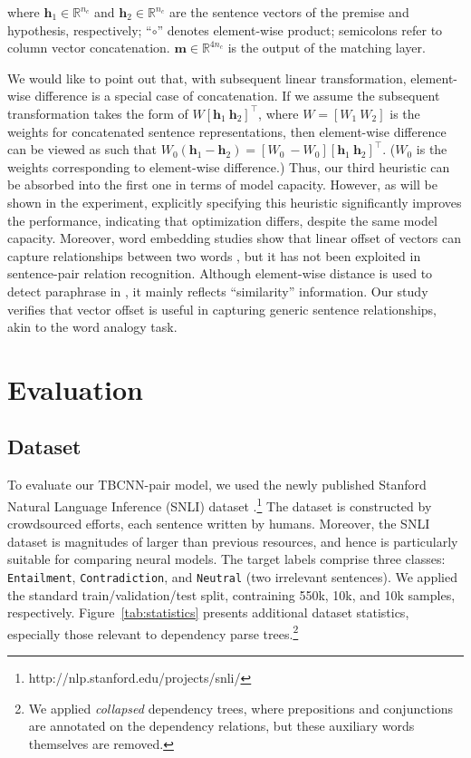 \documentclass[11pt]{article}
\begin{document}
\noindent where $\bm h_1\in\mathbb{R}^{n_c}$ and $\bm h_2\in\mathbb{R}^{n_c}$ are the sentence vectors of the premise and hypothesis, respectively; ``$\circ$'' denotes element-wise product; semicolons refer to column vector concatenation. $\bm m\in\mathbb{R}^{4n_c}$ is the output of the matching layer.

We would like to point out that, with subsequent linear transformation, element-wise difference is a special case of concatenation. 
If we assume the subsequent transformation takes the form of $W[\bm h_1\ \bm h_2]^\top$,
where $W\!\!=\!\![W_1\ W_2]$ is the weights for concatenated sentence representations, then element-wise difference can be viewed as such that $W_0(\bm h_1-\bm h_2)=[W_0\ -\!W_0][\bm h_1\ \bm h_2]^\top$. ($W_0$ is the weights corresponding to element-wise difference.)
Thus, our third heuristic can be absorbed into the first one in terms of model capacity. However, as will be shown in the experiment, explicitly specifying this heuristic significantly improves the performance, indicating that optimization differs, despite the same model capacity.
Moreover, word embedding studies show that linear offset of vectors can capture
relationships between two words \cite{offset}, but it has not been exploited in sentence-pair relation recognition. Although element-wise distance is used to detect paraphrase in , it mainly reflects ``similarity'' information. Our study verifies that vector offset is useful in capturing generic sentence relationships, akin to the word analogy task.

\vspace{-.1cm plus 0cm minus 0cm}
\section{Evaluation}\label{sec:Result}
\vspace{-.2cm plus 0cm minus 0cm}
\subsection{Dataset}\label{ss:dataset}
\vspace{-.1cm plus 0cm minus 0cm}

To evaluate our TBCNN-pair model, we used the newly published Stanford Natural Language Inference (SNLI) dataset \cite{NLI}.\footnote{http://nlp.stanford.edu/projects/snli/
} The dataset is constructed by crowdsourced efforts, each sentence written by humans. 
Moreover, the SNLI dataset is magnitudes of larger than previous resources, and hence is particularly suitable for comparing neural models.
The target labels comprise three classes: {\tt Entailment}, {\tt Contradiction}, and {\tt Neutral} (two irrelevant sentences). We applied the standard train/validation/test split, contraining 550k, 10k, and 10k samples, respectively. Figure~\ref{tab:statistics} presents additional dataset statistics, especially those relevant to dependency parse trees.\footnote{We applied \textit{collapsed} dependency trees, where prepositions and conjunctions are annotated on the dependency relations, but these auxiliary words themselves are removed.}
\end{document}
